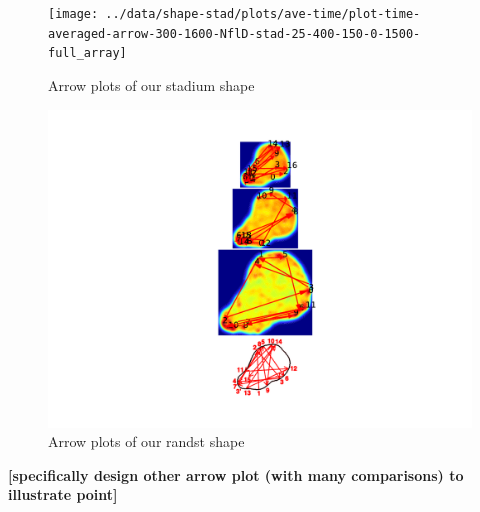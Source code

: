 \documentclass[letterpaper,twocolumn,amsmath,amssymb,pre]{revtex4-1}
\newcommand{\red}[1]{{\bf \color{red} #1}}
\newcommand{\fixme}[1]{\red{[#1]}}
\begin{document}
\begin{figure}
  \texttt{[image: ../data/shape-stad/plots/ave-time/plot-time-averaged-arrow-300-1600-NflD-stad-25-400-150-0-1500-full\_array]}
  \caption{Arrow plots of our stadium shape}
  \label{stadium-arrow}
\end{figure}

\begin{figure}
  \includegraphics[width=\columnwidth]{../paper/plot-ave}
  \caption{Arrow plots of our randst shape}
  \label{stadium-arrow}
\end{figure}



\fixme{specifically design other arrow plot (with many comparisons) to
  illustrate point}
\end{document}
